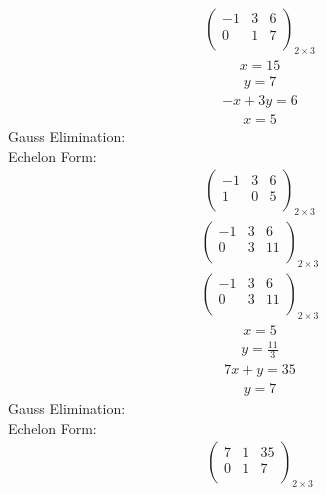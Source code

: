 \documentclass{article}
\begin{document}
\begin{align*}
\left(
\begin{array}{cc|c}
-1 & 3 & 6\\
0 & 1 & 7\\
\end{array}
\right)_{2\times 3}
\end{align*}
\begin{align*}
x=15\end{align*}
\begin{align*}
y=7\end{align*}
\begin{align*}
-x + 3y=6\end{align*}
\begin{align*}
x=5\end{align*}
Gauss Elimination:\\
Echelon Form:\\
\begin{align*}
\left(
\begin{array}{cc|c}
-1 & 3 & 6\\
1 & 0 & 5\\
\end{array}
\right)_{2\times 3}
\end{align*}
\begin{align*}
\left(
\begin{array}{cc|c}
-1 & 3 & 6\\
0 & 3 & 11\\
\end{array}
\right)_{2\times 3}
\end{align*}
\begin{align*}
\left(
\begin{array}{cc|c}
-1 & 3 & 6\\
0 & 3 & 11\\
\end{array}
\right)_{2\times 3}
\end{align*}
\begin{align*}
x=5\end{align*}
\begin{align*}
y=\frac{11}{3}\end{align*}
\begin{align*}
7x + y=35\end{align*}
\begin{align*}
y=7\end{align*}
Gauss Elimination:\\
Echelon Form:\\
\begin{align*}
\left(
\begin{array}{cc|c}
7 & 1 & 35\\
0 & 1 & 7\\
\end{array}
\right)_{2\times 3}
\end{align*}
\end{document}
